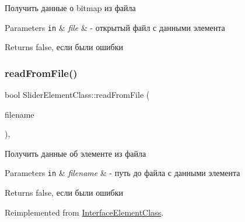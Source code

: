 Получить данные о bitmap из файла 


\begin{DoxyParams}[1]{Parameters}
\mbox{\tt in}  & {\em file} & -\/ открытый файл с данными элемента \\
\hline
\end{DoxyParams}
\begin{DoxyReturn}{Returns}
false, если были ошибки 
\end{DoxyReturn}
\mbox{\label{class_slider_element_class_a68082cc20a1c0940aa5057e5ece89a60}} 
\subsubsection{\texorpdfstring{read\+From\+File()}{readFromFile()}}
{\footnotesize\ttfamily bool Slider\+Element\+Class\+::read\+From\+File (\begin{DoxyParamCaption}\item[{\hyperlink{class_path_class}{Path\+Class} $\ast$}]{filename }\end{DoxyParamCaption})\hspace{0.3cm}{\ttfamily [private]}, {\ttfamily [virtual]}}



Получить данные об элементе из файла 


\begin{DoxyParams}[1]{Parameters}
\mbox{\tt in}  & {\em filename} & -\/ путь до файла с данными элемента \\
\hline
\end{DoxyParams}
\begin{DoxyReturn}{Returns}
false, если были ошибки 
\end{DoxyReturn}


Reimplemented from \hyperlink{class_interface_element_class_aadd932731787c60b3f395422188f2f58}{Interface\+Element\+Class}.

\mbox{\label{class_interface_element_class_afc8ee340b6aa0b99e3280b424aa5c519}} 
